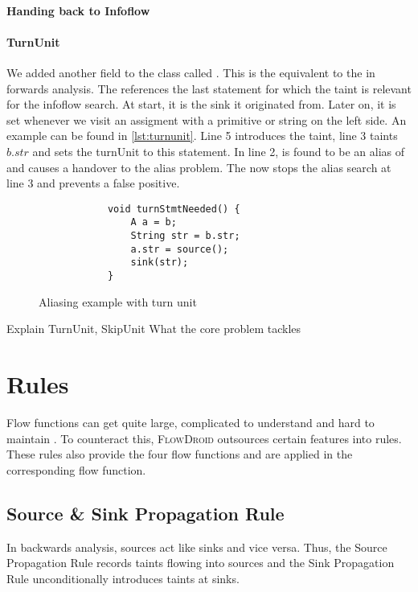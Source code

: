 \documentclass[../draft.tex]{subfiles}
\begin{document}
    \paragraph{Handing back to Infoflow}

    \paragraph{TurnUnit} 
    We added another field to the  class called . This is the equivalent to the  in forwards analysis. The  references the last statement for which the taint is relevant for the infoflow search. At start, it is the sink it originated from. Later on, it is set whenever we visit an assigment with a primitive or string on the left side. An example can be found in \autoref{lst:turnunit}. Line 5 introduces the taint, line 3 taints $b.str$ and sets the turnUnit to this statement. In line 2,  is found to be an alias of  and causes a handover to the alias problem. The  now stops the alias search at line 3 and prevents a false positive.

    \begin{figure}[ht]
        \centering
        \begin{lstlisting}
            void turnStmtNeeded() {
                A a = b;
                String str = b.str;
                a.str = source();
                sink(str);
            }
        \end{lstlisting}
        \caption{Aliasing example with turn unit}
        \label{lst:turnunit}
    \end{figure}


    Explain TurnUnit, SkipUnit
    What the core problem tackles

    \section{Rules}
    Flow functions can get quite large, complicated to understand and hard to maintain \cite{Lerch2015}. To counteract this, \textsc{FlowDroid} outsources certain features into rules. These rules also provide the four flow functions and are applied in the corresponding flow function.

    \subsection{Source \& Sink Propagation Rule}\label{s:sourcerule}
    In backwards analysis, sources act like sinks and vice versa. Thus, the Source Propagation Rule records taints flowing into sources and the Sink Propagation Rule unconditionally introduces taints at sinks.
\end{document}
